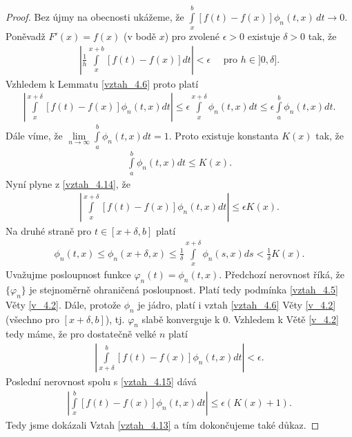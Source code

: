 \begin{theorem}[Romanovský]
\begin{proof}
Bez újmy na obecnosti ukážeme, že $\int \limits _x^b [f(t) - f(x)] \phi_n (t,x) \, dt \rightarrow 0$. Poněvadž $F'(x) = f(x)$ (v bodě $x$) pro zvolené $\epsilon > 0$ existuje $\delta > 0$ tak, že
\begin{align*}
\left| \frac{1}{h}\int \limits_x^{x+b} [f(t) - f(x)] dt \right| < \epsilon \quad \textrm{ pro } h \in ]0, \delta].
\end{align*}
Vzhledem k Lemmatu \eqref{vztah_4.6} proto platí
\begin{align}\label{vztah_4.14}
\left| \int \limits_x^{x+\delta} [f(t) - f(x)] \phi_n (t,x) dt \right| \leq \epsilon \int \limits_x^{x+\delta} \phi_n (t,x) dt \leq \epsilon \int \limits_a^b \phi_n (t,x) dt.
\end{align}
Dále víme, že $\lim \limits_{n \to \infty} \int \limits_a^b \phi_n (t,x) dt = 1$. Proto existuje konstanta $K(x)$ tak, že
\begin{align*}
\int \limits_a^b \phi_n (t,x) dt \leq K(x).
\end{align*}
Nyní plyne z \eqref{vztah_4.14}, že
\begin{align}\label{vztah_4.15}
\left| \int \limits_x^{x+\delta} [f(t) - f(x)] \phi_n (t,x) dt \right| \leq \epsilon K(x).
\end{align}
Na druhé straně pro $t \in [x + \delta, b]$ platí
\begin{align*}
\phi_n (t,x) \leq \phi_n (x + \delta, x) \leq \frac{1}{\delta} \int \limits_x^{x+\delta} \phi_n (s,x) ds < \frac{1}{\delta} K(x).
\end{align*}
Uvažujme posloupnost funkce $\varphi_n (t) = \phi_n (t,x)$. Předchozí nerovnost říká, že $\{ \varphi_n \}$ je stejnoměrně ohraničená posloupnost. Platí tedy podmínka \eqref{vztah_4.5} Věty \ref{v_4.2}. Dále, protože $\phi_n$ je jádro, platí i vztah \eqref{vztah_4.6} Věty \ref{v_4.2} (všechno pro $[x + \delta, b]$), tj. $\varphi_n$ slabě konverguje k $0$. Vzhledem k Větě \ref{v_4.2} tedy máme, že pro dostatečně velké $n$ platí
\begin{align*}
\left| \int \limits_{x + \delta}^b [f(t) - f(x)] \phi_n (t,x) dt \right| < \epsilon.
\end{align*}
Poslední nerovnost spolu s \eqref{vztah_4.15} dává
\begin{align*}
\left| \int \limits_x^b [f(t) - f(x)] \phi_n (t,x) dt \right| \leq \epsilon (K(x) + 1).
\end{align*}
Tedy jsme dokázali Vztah \eqref{vztah_4.13} a tím dokončujeme také d\r ukaz.
\end{proof}
\end{theorem}

